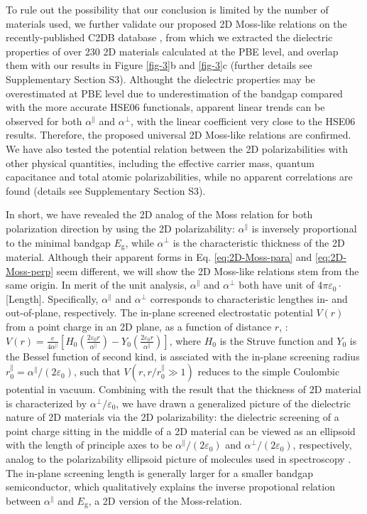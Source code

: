 \documentclass[journal=ancac3,manuscript=article,email=true,hyperref=true,keywords=false]{achemso}
\begin{document}
To rule out the possibility that our conclusion is limited by the
number of materials used, we further validate our proposed 2D
Moss-like relations on the recently-published C2DB database
\cite{Haastrup_2018}, from which we extracted the dielectric
properties of over 230 2D materials calculated at the PBE level, and
overlap them with our results in Figure \ref{fig-3}b and \ref{fig-3}c
(further details see Supplementary Section S3). Althought the
dielectric properties may be overestimated at PBE level due to
underestimation of the bandgap compared with the more accurate HSE06
functionals, apparent linear trends can be observed for both
$\alpha^{\parallel}$ and $\alpha^{\perp}$, with the linear coefficient
very close to the HSE06 results. Therefore, the proposed universal 2D
Moss-like relations are confirmed.  We have also tested the potential
relation between the 2D polarizabilities with other physical
quantities, including the effective carrier mass, quantum capacitance
and total atomic polarizabilities, while no apparent correlations are
found (details see Supplementary Section S3). 

In short, we have revealed the 2D analog of the Moss relation for both
polarization direction by using the 2D polarizability:
$\alpha^{\parallel}$ is inversely proportional to the minimal bandgap
$E_{\mathrm{g}}$, while $\alpha^{\perp}$ is the characteristic
thickness of the 2D material. Although their apparent forms in
Eq. \ref{eq:2D-Moss-para} and \ref{eq:2D-Moss-perp} seem different, we
will show the 2D Moss-like relations stem from the same origin. In
merit of the unit analysis, $\alpha^{\parallel}$ and $\alpha^{\perp}$
both have unit of $4\pi\varepsilon_{0} \cdot$[Length]. Specifically,
$\alpha^{\parallel}$ and $\alpha^{\perp}$ corresponds to
characteristic lengthes in- and out-of-plane, respectively. The
in-plane screened electrostatic potential $V(r)$ from a point charge
in an 2D plane, as a function of distance $r$,
\cite{Keldysh_1979_eps_multi,Pulci_2014}:
$V(r) = {\displaystyle \frac{e}{4 \alpha^{\parallel}}}
\left[H_{0}({\displaystyle \frac{2\varepsilon_{0}
      r}{\alpha^{\parallel}}}) - Y_{0}( {\displaystyle \frac{2
      \varepsilon_{0}r}{\alpha^{\parallel}}})\right]$, where $H_{0}$
is the Struve function and $Y_{0}$ is the Bessel function of second
kind, is assciated with the in-plane screening radius
$r_{0}^{\parallel}=\alpha^{\parallel}/(2 \varepsilon_{0})$, such that
$V(r,r/r^{\parallel}_{0} \gg 1)$ reduces to the simple Coulombic
potential in vacuum. Combining with the result that the thickness of
2D material is characterized by $\alpha^{\perp}/\varepsilon_{0}$, we
have drawn a generalized picture of the dielectric nature of 2D
materials via the 2D polarizability: the dielectric screening of a
point charge sitting in the middle of a 2D material can be viewed as
an ellipsoid with the length of principle axes to be
$\alpha^{\parallel}/(2 \varepsilon_{0})$ and
$\alpha^{\perp}/(2 \varepsilon_{0})$, respectively, analog to the
polarizability ellipsoid picture of molecules used in spectroscopy
\cite{Banwell_1994}. The in-plane screening length is generally larger
for a smaller bandgap semiconductor, which qualitatively explains the
inverse propotional relation between $\alpha^{\parallel}$ and
$E_{\mathrm{g}}$, a 2D version of the Moss-relation.
\end{document}
